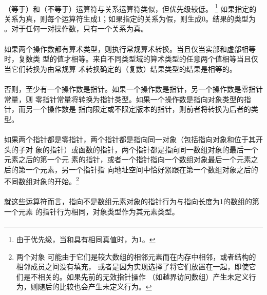 {\semantic
\paragraph{}
\tm{==}（等于）和\tm{!=}（不等于）运算符与关系运算符类似，但优先级较低。
\footnote{由于优先级，当和具有相同真值时，为1。}
如果指定的关系为真，则每个运算符生成1；如果指定的关系为假，则生成0。结果的类型为
。对于任何一对操作数，只有一个关系为真。

\paragraph{}
如果两个操作数都有算术类型，则执行常规算术转换。当且仅当实部和虚部相等时，复数类
型的值才相等。来自不同类型域的算术类型的任意两个值相等当且仅当它们转换为由常规算
术转换确定的（复数）结果类型的结果是相等的。

\paragraph{}
否则，至少有一个操作数是指针。如果一个操作数是指针，另一个操作数是零指针常量，则
零指针常量将转换为指针类型。如果一个操作数是指向对象类型的指针，而另一个操作数是
指向限定或不限定版本的指针，则前者将转换为后者的类型。

\paragraph{}
如果两个指针都是零指针，两个指针都是指向同一对象（包括指向对象和位于其开头的子对
象的指针）或函数的指针，两个指针都是指向同一数组对象的最后一个元素之后的第一个元
素的指针，或者一个指针指向一个数组对象最后一个元素之后的第一个元素，另一个指针指
向地址空间中恰好紧跟在第一个数组对象之后的不同数组对象的开始。\footnote{两个对象
可能由于它们是较大数组的相邻元素而在内存中相邻，或者结构的相邻成员之间没有填充，
或者是因为实现选择了将它们放置在一起，即使它们是不相关的。如果先前的无效指针操作
（如越界访问数组）产生未定义行为，则随后的比较也会产生未定义行为。}

\paragraph{}
就这些运算符而言，指向不是数组元素对象的指针行为与指向长度为1的数组的第一个元素
的指针行为相同，对象类型作为其元素类型。

\pagebreak
\syntax
\paragraph{}

}
